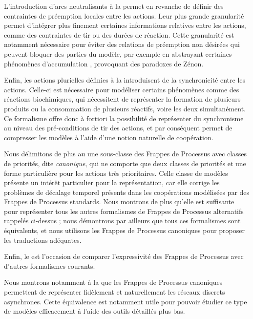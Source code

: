L'introduction d'arcs neutralisants à la  permet en revanche de définir
des contraintes de préemption locales entre les actions.
Leur plus grande granularité permet d'intégrer plus finement certaines informations
relatives entre les actions, comme des contraintes de tir ou des durées de réaction.
Cette granularité est notamment nécessaire pour éviter des relations de préemption
non désirées qui peuvent bloquer des parties du modèle,
par exemple en abstrayant certaines phénomènes d'accumulation ,
provoquant des paradoxes de Zénon.

Enfin, les actions plurielles définies à la  introduisent de la
synchronicité entre les actions.
Celle-ci est nécessaire pour modéliser certains phénomènes comme des réactions biochimiques,
qui nécessitent de représenter la formation de plusieurs produits ou la consommation de plusieurs
réactifs, voire les deux simultanément.
Ce formalisme offre donc à fortiori la possibilité de représenter du synchronisme au niveau des
pré-conditions de tir des actions, et par conséquent permet de compresser les modèles
à l'aide d'une notion naturelle de coopération.

\myskip

Nous délimitons de plus au  une sous-classe des Frappes de Processus
avec classes de priorités, dite \emph{canonique},
qui ne comporte que deux classes de priorités et une forme particulière pour les actions
très prioritaires.
Celle classe de modèles présente un intérêt particulier pour la représentation,
car elle corrige les problèmes de décalage temporel présents
dans les coopérations modélisées par des Frappes de Processus standards.
Nous montrons de plus qu'elle est suffisante pour représenter tous les autres
formalismes de Frappes de Processus alternatifs rappelés ci-dessus ;
nous démontrons par ailleurs que tous ces formalismes sont équivalents,
et nous utilisons les Frappes de Processus canoniques pour proposer
les traductions adéquates.

\myskip

Enfin, le  est l'occasion de comparer l'expressivité des
Frappes de Processus avec d'autres formalismes courants.

Nous montrons notamment à la  que les Frappes de Processus canoniques
permettent de représenter fidèlement et naturellement les réseaux discrets asynchrones.
Cette équivalence est notamment utile pour pouvoir étudier ce type de modèles
efficacement à l'aide des outils détaillés plus bas.


